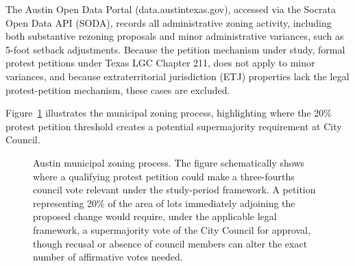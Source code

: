\documentclass[11pt, letterpaper, oneside]{article}
\begin{document}
The Austin Open Data Portal (data.austintexas.gov), accessed via the Socrata Open Data API (SODA), records all administrative zoning activity, including both substantive rezoning proposals and minor administrative variances, such as 5-foot setback adjustments. Because the petition mechanism under study, formal protest petitions under Texas LGC Chapter 211, does not apply to minor variances, and because extraterritorial jurisdiction (ETJ) properties lack the legal protest-petition mechanism, these cases are excluded.

Figure~\ref{fig:flowchart} illustrates the municipal zoning process, highlighting where the 20\% protest petition threshold creates a potential supermajority requirement at City Council.

\begin{figure}[H]
\centering
{}
\caption[Schematic of the Austin Zoning Process]{Austin municipal zoning process. The figure schematically shows where a qualifying protest petition could make a three-fourths council vote relevant under the study-period framework. A petition representing 20\% of the area of lots immediately adjoining the proposed change would require, under the applicable legal framework, a supermajority vote of the City Council for approval, though recusal or absence of council members can alter the exact number of affirmative votes needed.}
\label{fig:flowchart}
\end{figure}
\end{document}
